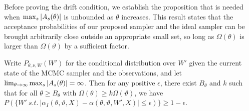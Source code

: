 \noindent Before proving the drift condition, we establish the proposition that
is needed when ${\max_s |A_s(\theta)|}$ is unbounded as $\theta$ increases.
This result states that the acceptance probabilities of our proposed
sampler and the ideal sampler can be brought arbitrarily close
outside an appropriate small set, so long as $\Omega(\theta)$ is larger
than $\Omega(\vartheta)$ by a sufficient factor. 
\begin{proposition}
  Write $P_{\theta,\nu,W}(W')$ for the conditional distribution over $W'$
  given the current state of the MCMC sampler and the observations, and let
  $\lim_{\theta\rightarrow\infty} {\max_s |A_s(\theta)|} = \infty$. Then for any positive 
  $\epsilon$, there exist $B_\theta$ and $k$ such that for all 
  $\theta \ge B_\theta$ with $\Omega(\theta) \ge k\Omega(\vartheta)$, we have 
  $P(\{W'\ s.t.\ |\alpha_I(\theta,\vartheta,X) - \alpha(\theta,\vartheta,W',X)| 
  \le \epsilon)\} \ge 1-\epsilon$.%
\label{prop:mix}
\end{proposition}

